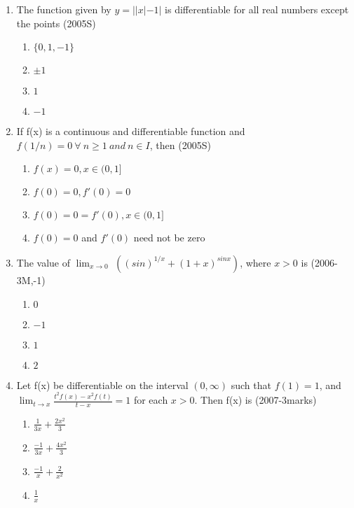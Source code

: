 \documentclass[journal,12pt,twocolumn]{IEEEtran}
\theoremstyle{remark}
\begin{document}
\begin{enumerate}[start=17]
\item %
{\begin{flushleft}
The function given by $y=||x|-1|$ is differentiable for all real numbers except the points \hfill{(2005S)}
    \begin{enumerate}
     \item $\{0,1,-1\}$
     \item $\pm 1$
     \item $1$
     \item $-1$\\
    \end{enumerate}
\end{flushleft}}
\newpage
\item %
{\begin{flushleft}
If f(x) is a continuous and differentiable function and $f(1/n)=0\ \forall\ n\geq1\ and\ n\in I$, then   \hfill{(2005S)}
    \begin{enumerate}
     \item $f(x)=0,x\in(0,1]$
     \item $f(0)=0,f'(0)=0$
     \item $f(0)=0=f'(0), x\in(0,1]$
     \item $f(0)=0$ and $f'(0)$ need not be zero\\
    \end{enumerate}
\end{flushleft}}

\item %
{\begin{flushleft}
The value of $\lim_{x \to 0}$ $\left( (sin)^{1/x} + (1+x)^{sinx}\right)$, where $x > 0$ is \hfill{(2006-3M,-1)}
    \begin{enumerate}
     \item $0$
     \item $-1$
     \item $1$
     \item  $2$\\
    \end{enumerate}
\end{flushleft}}

\item %
{\begin{flushleft}
Let f(x) be differentiable on the interval $(0,\infty)$ such that $f(1)=1$, and $\lim_{t \to x} \frac{t^2f(x)-x^2f(t)}{t-x}=1$ for each $x>0$. Then f(x) is \hfill{(2007-3marks)}
    \begin{enumerate}
     \item $\frac{1}{3x}+\frac{2x^2}{3}$\\
     \item $\frac{-1}{3x}+\frac{4x^2}{3}$\\
     \item $\frac{-1}{x}+\frac{2}{x^2}$\\
     \item $\frac{1}{x}$\\
    \end{enumerate}
\end{flushleft}}


\end{enumerate}
\end{document}
